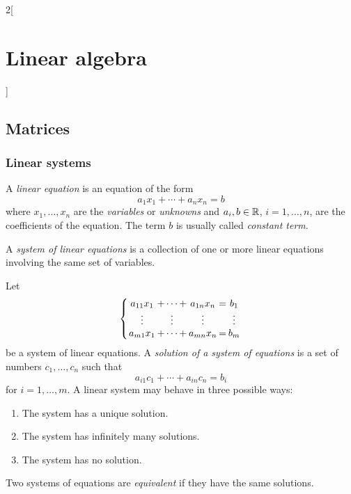 \documentclass[../../../main.tex]{subfiles}
\begin{document}
\begin{multicols}{2}[\section{Linear algebra}]
\subsection{Matrices}
\subsubsection*{Linear systems}
\begin{definition}
    A \textit{linear equation} is an equation of the form $$a_1x_1+\cdots+a_nx_n=b$$ where $x_1,\ldots,x_n$ are the \textit{variables} or \textit{unknowns} and $a_i,b\in\mathbb{R}$, $i=1,\ldots,n$, are the coefficients of the equation. The term $b$ is usually called \textit{constant term}.
\end{definition}
\begin{definition}
    A \textit{system of linear equations} is a collection of one or more linear equations involving the same set of variables.
\end{definition}
\begin{definition}
    Let
    \begin{equation*}
        \arraycolsep=1pt
        \left\{
        \begin{array}{ccccc}
            a_{11}x_1 & + \cdots + & a_{1n}x_n & = & b_1\\
            \vdots & \vdots & \vdots & & \vdots\\
            a_{m1}x_1 & + \cdots + & a_{mn}x_n & = & b_m
        \end{array}
        \right.
    \end{equation*}
    be a system of linear equations. A \textit{solution of a system of equations} is a set of numbers $c_1,\ldots,c_n$ such that $$a_{i1}c_1+\cdots+a_{in}c_n=b_i$$ for $i=1,\ldots,m$. A linear system may behave in three possible ways:
    \begin{enumerate}
        \item The system has a unique solution. 
        \item The system has infinitely many solutions.
        \item The system has no solution.
    \end{enumerate}
\end{definition}
\begin{definition}
    Two systems of equations are \textit{equivalent} if they have the same solutions.
\end{definition}

\end{multicols}
\end{document}
